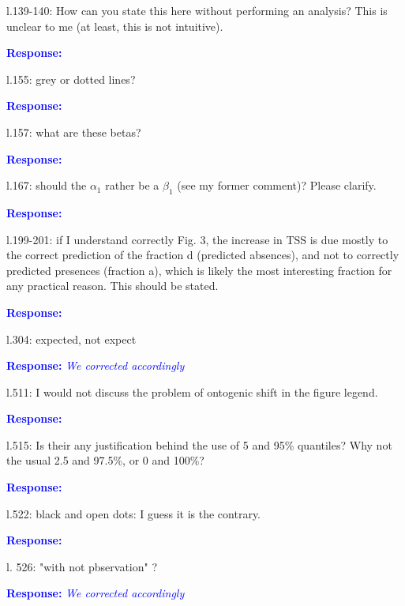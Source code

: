 \documentclass [12pt,onecolumn,twoside,openright]{report}
\begin{document}
\begin{onehalfspacing}
\medskip l.139-140: How can you state this here without
performing an analysis? This is unclear to me (at least, this is not intuitive).


\textcolor{blue}{\textbf{Response:}} \textit{\textcolor{blue}{}}

\medskip l.155: grey or dotted lines?

\textcolor{blue}{\textbf{Response:}} \textit{\textcolor{blue}{}}

\medskip l.157: what are these betas?

\textcolor{blue}{\textbf{Response:}} \textit{\textcolor{blue}{}}

\medskip l.167: should the $\alpha_1$ rather be a $\beta_1$
(see my former comment)? Please clarify.


\textcolor{blue}{\textbf{Response:}} \textit{\textcolor{blue}{}}

\medskip l.199-201: if I understand correctly Fig. 3, the
increase in TSS is due mostly to the correct prediction of the fraction d
(predicted absences), and not to correctly predicted presences (fraction a),
which is likely the most interesting fraction for any practical reason. This
should be stated.

\textcolor{blue}{\textbf{Response:}} \textit{\textcolor{blue}{}}

\medskip l.304: expected, not expect

\textcolor{blue}{\textbf{Response:}} \textit{\textcolor{blue}{We corrected accordingly}}

\medskip l.511: I would not discuss the problem of ontogenic
shift in the figure legend.

\textcolor{blue}{\textbf{Response:}} \textit{\textcolor{blue}{}}

\medskip l.515: Is their any justification behind the use of 5
and 95\% quantiles? Why not the usual 2.5 and 97.5\%, or 0 and 100\%?

\textcolor{blue}{\textbf{Response:}} \textit{\textcolor{blue}{}}

\medskip l.522: black and open dots: I guess it is the
contrary.

\textcolor{blue}{\textbf{Response:}} \textit{\textcolor{blue}{}}

\medskip l. 526: "with not pbservation" ?

\textcolor{blue}{\textbf{Response:}} \textit{\textcolor{blue}{We corrected accordingly}}


\end{onehalfspacing}
\end{document}
